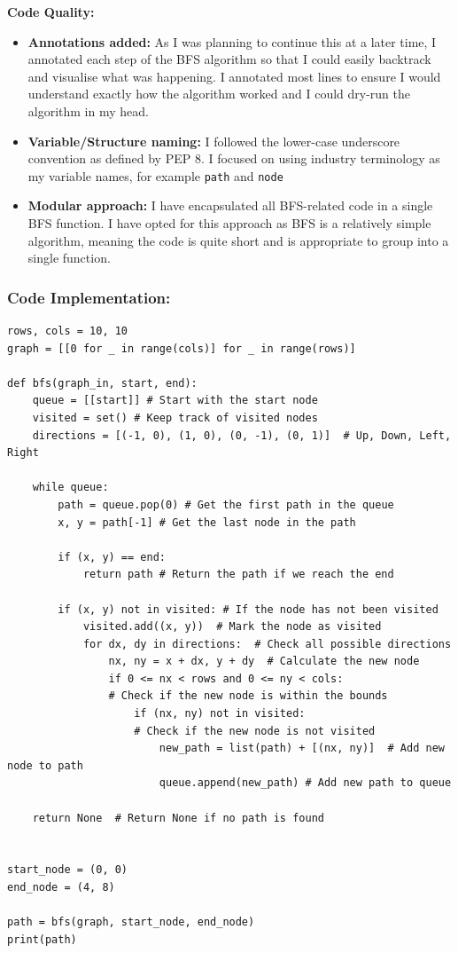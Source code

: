 \textbf{Code Quality:}
\begin{itemize}
    \item \textbf{Annotations added:} As I was planning to continue this at a later time, I annotated each step of the BFS algorithm so that I could easily backtrack and visualise what was happening. I annotated most lines to ensure I would understand exactly how the algorithm worked and I could dry-run the algorithm in my head.
    \item \textbf{Variable/Structure naming:} I followed the lower-case underscore convention as defined by PEP 8. I focused on using industry terminology as my variable names, for example \verb|path| and \verb|node| 
    \item \textbf{Modular approach:} I have encapsulated all BFS-related code in a single BFS function. I have opted for this approach as BFS is a relatively simple algorithm, meaning the code is quite short and is appropriate to group into a single function.
\end{itemize}

\newpage

\subsubsection{Code Implementation:}
\begin{verbatim}
rows, cols = 10, 10
graph = [[0 for _ in range(cols)] for _ in range(rows)]

def bfs(graph_in, start, end):
    queue = [[start]] # Start with the start node
    visited = set() # Keep track of visited nodes
    directions = [(-1, 0), (1, 0), (0, -1), (0, 1)]  # Up, Down, Left, Right

    while queue:
        path = queue.pop(0) # Get the first path in the queue
        x, y = path[-1] # Get the last node in the path

        if (x, y) == end:
            return path # Return the path if we reach the end

        if (x, y) not in visited: # If the node has not been visited
            visited.add((x, y))  # Mark the node as visited
            for dx, dy in directions:  # Check all possible directions
                nx, ny = x + dx, y + dy  # Calculate the new node
                if 0 <= nx < rows and 0 <= ny < cols:  
                # Check if the new node is within the bounds
                    if (nx, ny) not in visited: 
                    # Check if the new node is not visited
                        new_path = list(path) + [(nx, ny)]  # Add new node to path
                        queue.append(new_path) # Add new path to queue

    return None  # Return None if no path is found


start_node = (0, 0)
end_node = (4, 8)

path = bfs(graph, start_node, end_node)
print(path)

\end{verbatim}

